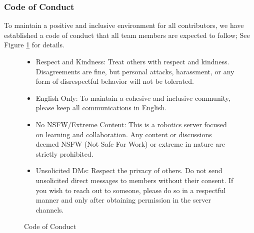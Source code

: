 \subsubsection{Code of Conduct}

To maintain a positive and inclusive environment for all contributors, we have established a code of conduct that all team members are expected to follow; See Figure \ref{fig:code-of-conduct} for details.

\begin{figure}[H]
    \centering
    \begin{minipage}{0.9\textwidth}
        \begin{itemize}
            \item Respect and Kindness: Treat others with respect and kindness. Disagreements are fine, but personal attacks, harassment, or any form of disrespectful behavior will not be tolerated.
            \item English Only: To maintain a cohesive and inclusive community, please keep all communications in English.
            \item No NSFW/Extreme Content: This is a robotics server focused on learning and collaboration. Any content or discussions deemed NSFW (Not Safe For Work) or extreme in nature are strictly prohibited.
            \item Unsolicited DMs: Respect the privacy of others. Do not send unsolicited direct messages to members without their consent. If you wish to reach out to someone, please do so in a respectful manner and only after obtaining permission in the server channels.
        \end{itemize}
    \end{minipage}
    \caption{Code of Conduct}
    \label{fig:code-of-conduct}
\end{figure}





